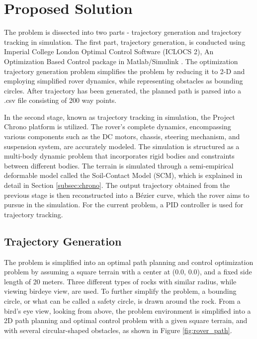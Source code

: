 \documentclass{article}
\begin{document}
\section{Proposed Solution}

The problem is dissected into two parts - trajectory generation and trajectory tracking in simulation. The first part, trajectory generation, is conducted using Imperial College London Optimal Control Software (ICLOCS 2), An Optimization Based Control package in Matlab/Simulink \cite{iclocs}. The optimization trajectory generation problem simplifies the problem by reducing it to 2-D and employing simplified rover dynamics, while representing obstacles as bounding circles. After trajectory has been generated, the planned path is parsed into a .csv file consisting of 200 way points. 

In the second stage, known as trajectory tracking in simulation, the Project Chrono platform is utilized. The rover's complete dynamics, encompassing various components such as the DC motors, chassis, steering mechanism, and suspension system, are accurately modeled. The simulation is structured as a multi-body dynamic problem that incorporates rigid bodies and constraints between different bodies. The terrain is simulated through a semi-empirical deformable model called the Soil-Contact Model (SCM), which is explained in detail in Section \ref{subsec:chrono}. The output trajectory obtained from the previous stage is then reconstructed into a Bézier curve, which the rover aims to pursue in the simulation. For the current problem, a PID controller is used for trajectory tracking.

\subsection{Trajectory Generation}

The problem is simplified into an optimal path planning and control optimization problem by assuming a square terrain with a center at (0.0, 0.0), and a fixed side length of 20 meters. Three different types of rocks with similar radius, while viewing birdeye view, are used. To further simplify the problem, a bounding circle, or what can be called a safety circle, is drawn around the rock. From a bird's eye view, looking from above, the problem environment is simplified into a 2D path planning and optimal control problem with a given square terrain, and with several circular-shaped obstacles, as shown in Figure \ref{fig:rover_path}.
\end{document}
